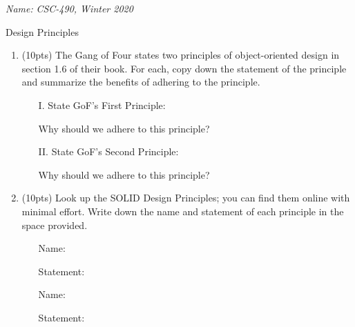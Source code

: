 \documentclass[11pt]{article}
\newlength{\up}\setlength{\up}{-\baselineskip}
\begin{document}
\noindent\emph{Name:}
\hfill
\emph{CSC-490, Winter 2020}

\begin{center}
  {\huge Design Principles}
\end{center}

\medskip


\begin{enumerate}

  \item (10pts) The Gang of Four states two principles of object-oriented design in section 1.6 of their book. For each, copy down the statement of the principle and summarize the benefits of adhering to the principle. 

  \begin{enumerate}

    \item[I.] State GoF's First Principle:

    \vfill

    Why should we adhere to this principle?

    \vfill
    \vfill
    \vfill

    \item[II.] State GoF's Second Principle:

    \vfill

    Why should we adhere to this principle?

    \vfill
    \vfill
    \vfill

  \end{enumerate}

\newpage

  \item (10pts) Look up the SOLID Design Principles; you can find them online with minimal effort. Write down the name and statement of each principle in the space provided.

  \begin{enumerate}

    \item[\fbox{\bf S}] Name:

    \vfill

    Statement:

    \vfill
    \vfill
    \vfill
    \vfill 

    \item[\fbox{\bf O}] Name:

    \vfill

    Statement:

    \vfill
    \vfill
    \vfill
    \vfill


\end{enumerate}
\end{enumerate}
\end{document}

